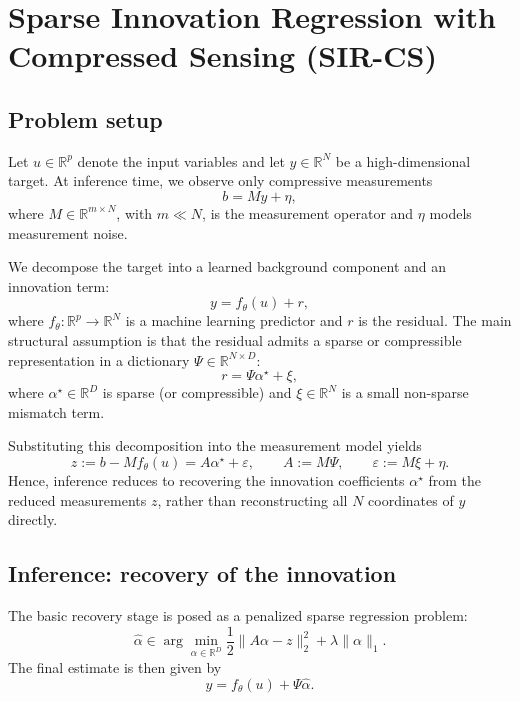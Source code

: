 
\section{Sparse Innovation Regression with Compressed Sensing (SIR-CS)}
\label{sec:sir_cs}

\subsection{Problem setup}
Let $u \in \mathbb{R}^p$ denote the input variables and let
$y \in \mathbb{R}^N$ be a high-dimensional target.
At inference time, we observe only compressive measurements
\begin{equation}
  b = M y + \eta,
\end{equation}
where $M \in \mathbb{R}^{m \times N}$, with $m \ll N$, is the measurement operator and
$\eta$ models measurement noise.

We decompose the target into a learned background component and an innovation term:
\begin{equation}
  y = f_\theta(u) + r,
\end{equation}
where $f_\theta : \mathbb{R}^p \to \mathbb{R}^N$ is a machine learning predictor and $r$ is the residual.
The main structural assumption is that the residual admits a sparse or compressible representation in a dictionary
$\Psi \in \mathbb{R}^{N \times D}$:
\begin{equation}
  r = \Psi \alpha^\star + \xi,
\end{equation}
where $\alpha^\star \in \mathbb{R}^D$ is sparse (or compressible) and $\xi \in \mathbb{R}^N$
is a small non-sparse mismatch term.

Substituting this decomposition into the measurement model yields
\begin{equation}
  z := b - M f_\theta(u) = A \alpha^\star + \varepsilon,
  \qquad
  A := M \Psi,
  \qquad
  \varepsilon := M \xi + \eta.
\end{equation}
Hence, inference reduces to recovering the innovation coefficients $\alpha^\star$
from the reduced measurements $z$, rather than reconstructing all $N$ coordinates of $y$ directly.

\subsection{Inference: recovery of the innovation}
The basic recovery stage is posed as a penalized sparse regression problem:
\begin{equation}
  \hat{\alpha}
  \in
  \arg\min_{\alpha \in \mathbb{R}^D}
  \frac{1}{2}\|A\alpha - z\|_2^2 + \lambda \|\alpha\|_1.
\end{equation}
The final estimate is then given by
\begin{equation}
  \hat{y} = f_\theta(u) + \Psi \hat{\alpha}.
\end{equation}

